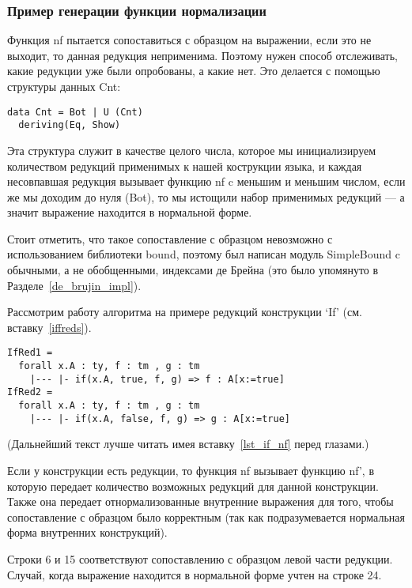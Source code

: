 \pagebreak
\subsubsection{Пример генерации функции нормализации}

Функция nf пытается сопоставиться с образцом на выражении, если это не выходит, то данная редукция неприменима. Поэтому нужен способ отслеживать, какие редукции уже были опробованы, а какие нет. Это делается с помощью структуры данных Cnt:

\begin{lstlisting}
data Cnt = Bot | U (Cnt)
  deriving(Eq, Show)
\end{lstlisting}

Эта структура служит в качестве целого числа, которое мы инициализируем количеством редукций применимых к нашей кострукции языка, и каждая несовпавшая редукция вызывает функцию nf c меньшим и меньшим числом, если же мы доходим до нуля (Bot), то мы истощили набор применимых редукций --- а значит выражение находится в нормальной форме.

Стоит отметить, что такое сопоставление с образцом невозможно с использованием библиотеки bound\cite{bound}, поэтому был написан модуль SimpleBound c обычными, а не обобщенными, индексами де Брейна (это было упомянуто в Разделе~\ref{de_brujin_impl}).

Рассмотрим работу алгоритма на примере редукций конструкции `If' (см. вставку~\ref{iffreds}).

\begin{lstlisting}[label={iffreds}, caption={Правила редукций для конструкции If},captionpos=b, frame=single, float, floatplacement=H]
IfRed1 =
  forall x.A : ty, f : tm , g : tm
    |--- |- if(x.A, true, f, g) => f : A[x:=true]
IfRed2 =
  forall x.A : ty, f : tm , g : tm
    |--- |- if(x.A, false, f, g) => g : A[x:=true]
\end{lstlisting}

(Дальнейший текст лучше читать имея вставку~\ref{lst_if_nf} перед глазами.)

Если у конструкции есть редукции, то функция nf вызывает функцию nf', в которую передает количество возможных редукций для данной конструкции. Также она передает отнормализованные внутренние выражения для того, чтобы сопоставление с образцом было корректным (так как подразумевается нормальная форма внутренних конструкций).

Строки 6 и 15 соответствуют сопоставлению с образцом левой части редукции. Случай, когда выражение находится в нормальной форме учтен на строке 24.

